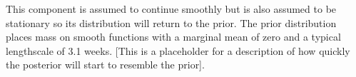 This component is assumed to continue smoothly but is also assumed to be stationary so its distribution will return to the prior.
The prior distribution places mass on smooth functions with a marginal mean of zero and a typical lengthscale of 3.1 weeks.
[This is a placeholder for a description of how quickly the posterior will start to resemble the prior].